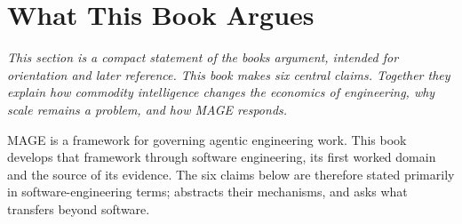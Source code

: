 



\chapter{What This Book Argues}

\emph{This section is a compact statement of the book\textquotesingle s argument, intended for orientation and later reference. This book makes six central claims. Together they explain how commodity intelligence changes the economics of engineering, why scale remains a problem, and how MAGE responds.}

MAGE is a framework for governing agentic engineering work. This book develops that framework through software engineering, its first worked domain and the source of its evidence. The six claims below are therefore stated primarily in software-engineering terms;  abstracts their mechanisms, and  asks what transfers beyond software.

